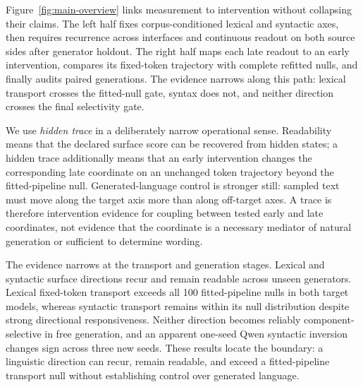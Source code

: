 Figure~\ref{fig:main-overview} links measurement to intervention without collapsing their claims. The left half fixes corpus-conditioned lexical and syntactic axes, then requires recurrence across interfaces and continuous readout on both source sides after generator holdout. The right half maps each late readout to an early intervention, compares its fixed-token trajectory with complete refitted nulls, and finally audits paired generations. The evidence narrows along this path: lexical transport crosses the fitted-null gate, syntax does not, and neither direction crosses the final selectivity gate.

We use \emph{hidden trace} in a deliberately narrow operational sense. Readability means that the declared surface score can be recovered from hidden states; a hidden trace additionally means that an early intervention changes the corresponding late coordinate on an unchanged token trajectory beyond the fitted-pipeline null. Generated-language control is stronger still: sampled text must move along the target axis more than along off-target axes. A trace is therefore intervention evidence for coupling between tested early and late coordinates, not evidence that the coordinate is a necessary mediator of natural generation or sufficient to determine wording.

The evidence narrows at the transport and generation stages. Lexical and syntactic surface directions recur and remain readable across unseen generators. Lexical fixed-token transport exceeds all 100 fitted-pipeline nulls in both target models, whereas syntactic transport remains within its null distribution despite strong directional responsiveness. Neither direction becomes reliably component-selective in free generation, and an apparent one-seed Qwen syntactic inversion changes sign across three new seeds. These results locate the boundary: a linguistic direction can recur, remain readable, and exceed a fitted-pipeline transport null without establishing control over generated language.

